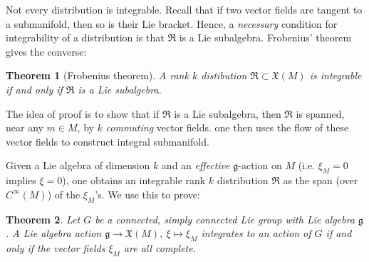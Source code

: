 \documentclass{article}
\newtheorem{theorem}{Theorem}[section]
\theoremstyle{remark}
\newtheorem{exercise}[theorem]{Exercise}
\newcommand\lie[1]{\mathfrak{#1}}
\newcommand{\g}{\lie{g}}
\newcommand{\f}{\frac}
\newcommand{\p}{\partial}
\newcommand{\mf}{\mathfrak}
\begin{document}
Not every distribution is integrable. Recall that if two vector fields are tangent to a submanifold, then so 
is their Lie bracket. Hence, a \emph{necessary} condition for integrability of a distribution is that 
$\mf{R}$ is a Lie subalgebra. Frobenius' theorem gives the converse: 
%
\begin{theorem}[Frobenius theorem] A rank $k$ distibution $\mf{R}\subset \mf{X}(M)$ 
is integrable if and only if $\mf{R}$ is a Lie subalgebra. 
\end{theorem}
%
The idea of proof is to show that if $\mf{R}$ is a Lie subalgebra, then  
$\mf{R}$ is spanned, near any $m\in M$, by $k$ \emph{commuting} vector fields. 
one then uses the flow of these vector fields to construct integral submanifold. 
%

Given a Lie algebra of dimension $k$ and an \emph{effective} $\g$-action on $M$ (i.e. $\xi_M=0$ implies $\xi=0$), 
one obtains an integrable rank $k$ distribution $\mf{R}$ as the span (over $C^\infty(M)$) of the $\xi_M$'s. 
We use this to prove: 

\begin{theorem}
Let $G$ be a connected, simply connected Lie group with Lie algebra $\g$. 
A Lie algebra action $\g\to \mf{X}(M),\ \xi\mapsto \xi_M$ integrates to an 
action of $G$ if and only if the vector fields $\xi_M$ are all complete.  
\end{theorem}
\end{document}
